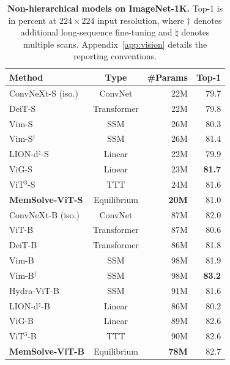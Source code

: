 \documentclass[10pt,twocolumn]{article}
\let\draftsmall\small
\renewcommand{\small}{\draftsmall\fontsize{9}{10}\selectfont}
\begin{document}
\begin{table}[!ht]
\centering
\small
\captionsetup{width=.94\linewidth}
\setlength{\tabcolsep}{5.2pt}
\renewcommand{\arraystretch}{1.03}
\begin{tabular}{lcrr}
\toprule
Method & Type & \#Params & Top-1\\
\midrule
ConvNeXt-S (iso.) \cite{liu2022convnext} & ConvNet & 22M & 79.7\\
DeiT-S \cite{touvron2021deit} & Transformer & 22M & 79.8\\
Vim-S \cite{zhu2024vim} & SSM & 26M & 80.3\\
Vim-S$^\dagger$ \cite{zhu2024vim} & SSM & 26M & 81.4\\
LION-d$^\natural$-S \cite{afzal2025lion} & Linear & 22M & 79.9\\
ViG-S \cite{liao2025vig} & Linear & 23M & \textbf{81.7}\\
ViT$^3$-S \cite{han2026vit3} & TTT & 24M & 81.6\\
\rowcolor{ResultYellow}
\textbf{MemSolve-ViT-S} & Equilibrium & \textbf{20M} & 81.0\\
\midrule
ConvNeXt-B (iso.) \cite{liu2022convnext} & ConvNet & 87M & 82.0\\
ViT-B \cite{hwang2024hydra} & Transformer & 87M & 80.6\\
DeiT-B \cite{touvron2021deit} & Transformer & 86M & 81.8\\
Vim-B \cite{zhu2024vim} & SSM & 98M & 81.9\\
Vim-B$^\dagger$ \cite{zhu2024vim} & SSM & 98M & \textbf{83.2}\\
Hydra-ViT-B \cite{hwang2024hydra} & SSM & 91M & 81.6\\
LION-d$^\natural$-B \cite{afzal2025lion} & Linear & 86M & 80.2\\
ViG-B \cite{liao2025vig} & Linear & 89M & 82.6\\
ViT$^3$-B \cite{han2026vit3} & TTT & 90M & 82.6\\
\rowcolor{ResultYellow}
\textbf{MemSolve-ViT-B} & Equilibrium & \textbf{78M} & 82.7\\
\bottomrule
\end{tabular}
\caption{\textbf{Non-hierarchical models on ImageNet-1K.}
Top-1 is in percent at $224\times224$ input resolution, where $\dagger$
denotes additional long-sequence fine-tuning and $\natural$ denotes multiple
scans. Appendix~\ref{app:vision} details the reporting conventions.}
\label{tab:imagenet}
\end{table}
\end{document}
